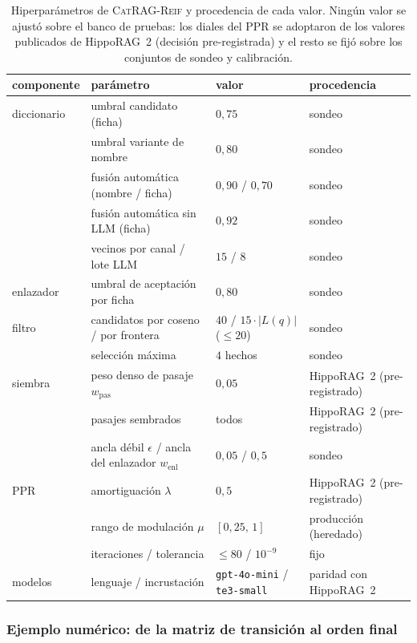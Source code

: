 \documentclass[11pt,a4paper]{article}
\newcommand{\sys}{\textsc{CatRAG-Reif}}          %
\newcommand{\hippo}{HippoRAG~2}
\begin{document}
\begin{table}[t]
\centering\small
\caption{Hiperparámetros de \sys{} y procedencia de cada valor. Ningún valor
se ajustó sobre el banco de pruebas: los diales del PPR se adoptaron de los
valores publicados de \hippo{} (decisión pre-registrada) y el resto se fijó
sobre los conjuntos de sondeo y calibración.}
\label{tab:hiper}
\footnotesize\setlength{\tabcolsep}{3.5pt}
\begin{tabular}{llll}
\toprule
componente & parámetro & valor & procedencia\\
\midrule
diccionario & umbral candidato (ficha) & $0{,}75$ & sondeo\\
            & umbral variante de nombre & $0{,}80$ & sondeo\\
            & fusión automática (nombre / ficha) & $0{,}90$ / $0{,}70$ & sondeo\\
            & fusión automática sin LLM (ficha) & $0{,}92$ & sondeo\\
            & vecinos por canal / lote LLM & $15$ / $8$ & sondeo\\
enlazador   & umbral de aceptación por ficha & $0{,}80$ & sondeo\\
filtro      & candidatos por coseno / por frontera & $40$ / $15\cdot|L(q)|$ ($\le 20$) & sondeo\\
            & selección máxima & $4$ hechos & sondeo\\
siembra     & peso denso de pasaje $w_{\text{pas}}$ & $0{,}05$ & \hippo{} (pre-registrado)\\
            & pasajes sembrados & todos & \hippo{} (pre-registrado)\\
            & ancla débil $\epsilon$ / ancla del enlazador $w_{\text{enl}}$ & $0{,}05$ / $0{,}5$ & sondeo\\
PPR         & amortiguación $\lambda$ & $0{,}5$ & \hippo{} (pre-registrado)\\
            & rango de modulación $\mu$ & $[0{,}25,\,1]$ & producción (heredado)\\
            & iteraciones / tolerancia & $\le 80$ / $10^{-9}$ & fijo\\
modelos     & lenguaje / incrustación & \texttt{gpt-4o-mini} / \texttt{te3-small} & paridad con \hippo{}\\
\bottomrule
\end{tabular}
\end{table}

\subsubsection{Ejemplo numérico: de la matriz de transición al orden final}
\label{sec:ppr-ejemplo}
\end{document}
